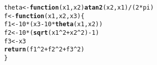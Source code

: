 \documentclass{article}\usepackage[]{graphicx}\usepackage[]{color}
\makeatletter
\newcommand{\hlnum}[1]{\textcolor[rgb]{0.686,0.059,0.569}{#1}}%
\newcommand{\hlopt}[1]{\textcolor[rgb]{0,0,0}{#1}}%
\newcommand{\hlstd}[1]{\textcolor[rgb]{0.345,0.345,0.345}{#1}}%
\newcommand{\hlkwa}[1]{\textcolor[rgb]{0.161,0.373,0.58}{\textbf{#1}}}%
\newcommand{\hlkwb}[1]{\textcolor[rgb]{0.69,0.353,0.396}{#1}}%
\newcommand{\hlkwc}[1]{\textcolor[rgb]{0.333,0.667,0.333}{#1}}%
\newcommand{\hlkwd}[1]{\textcolor[rgb]{0.737,0.353,0.396}{\textbf{#1}}}%
\newenvironment{kframe}{%
 \def\at@end@of@kframe{}%
 \ifinner\ifhmode%
  \def\at@end@of@kframe{\end{minipage}}%
  \begin{minipage}{\columnwidth}%
 \fi\fi%
 \def\FrameCommand##1{\hskip\@totalleftmargin \hskip-\fboxsep
 \colorbox{shadecolor}{##1}\hskip-\fboxsep
     \hskip-\linewidth \hskip-\@totalleftmargin \hskip\columnwidth}%
 \MakeFramed {\advance\hsize-\width
   \@totalleftmargin\z@ \linewidth\hsize
   \@setminipage}}%
 {\par\unskip\endMakeFramed%
 \at@end@of@kframe}
\newenvironment{knitrout}{}{} %
\makeatother
\begin{document}
\begin{knitrout}
\color{fgcolor}\begin{kframe}
\begin{alltt}
\hlstd{theta} \hlkwb{<-} \hlkwa{function}\hlstd{(}\hlkwc{x1}\hlstd{,} \hlkwc{x2}\hlstd{)} \hlkwd{atan2}\hlstd{(x2, x1)}\hlopt{/}\hlstd{(}\hlnum{2}\hlopt{*}\hlstd{pi)}
\hlstd{f} \hlkwb{<-} \hlkwa{function}\hlstd{(}\hlkwc{x1}\hlstd{,} \hlkwc{x2}\hlstd{,} \hlkwc{x3}\hlstd{) \{}
  \hlstd{f1} \hlkwb{<-} \hlnum{10}\hlopt{*}\hlstd{(x3} \hlopt{-} \hlnum{10}\hlopt{*}\hlkwd{theta}\hlstd{(x1, x2))}
  \hlstd{f2} \hlkwb{<-} \hlnum{10}\hlopt{*}\hlstd{(}\hlkwd{sqrt}\hlstd{(x1}\hlopt{^}\hlnum{2}\hlopt{+}\hlstd{x2}\hlopt{^}\hlnum{2}\hlstd{)}\hlopt{-}\hlnum{1}\hlstd{)}
  \hlstd{f3} \hlkwb{<-} \hlstd{x3}
  \hlkwd{return}\hlstd{(f1}\hlopt{^}\hlnum{2}\hlopt{+}\hlstd{f2}\hlopt{^}\hlnum{2}\hlopt{+}\hlstd{f3}\hlopt{^}\hlnum{2}\hlstd{)}
\hlstd{\}}


\end{alltt}
\end{kframe}
\end{knitrout}
\end{document}
